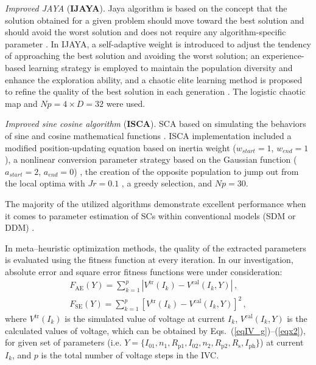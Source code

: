 \documentclass[a4paper,fleqn]{cas-sc}
\begin{document}
\emph{Improved JAYA} (\textbf{IJAYA}).
Jaya algorithm is based on the concept
that the solution obtained for a given problem should move toward the best solution and should
avoid the worst solution and does not require any algorithm-specific parameter \cite{JAYA}.
In IJAYA, a self-adaptive weight is introduced to adjust the tendency of approaching the best solution
and avoiding the worst solution;
an experience-based learning strategy is employed to maintain the population diversity and enhance the exploration ability,
and a chaotic elite learning method is proposed to refine the quality of the best solution in each generation \cite{IJAYA}.
The logistic chaotic map and $N\!p=4\times D=32$ were used.

\emph{Improved sine cosine algorithm} (\textbf{ISCA}).
SCA based on simulating the behaviors of sine and cosine mathematical functions \cite{SCA}.
ISCA implementation included a modified position-updating equation based on inertia weight
($w_{start}=1$, $w_{end}=1$),
a nonlinear conversion parameter strategy based on the Gaussian function
($a_{start}=2$, $a_{end}=0$) \cite{ISCA2},
the creation of the opposite population to jump out from the local optima with $J\!r=0.1$ \cite{ISCA3},
a greedy selection, and $N\!p=30$.

The majority of the utilized algorithms demonstrate excellent performance when
it comes to parameter estimation of SCs within conventional models (SDM or DDM) \cite{CWOA,DEWang,GOTLBO,IJAYA,MABC,PSO,STLBO,TLBO_Patel,LSHADE,IWOA}.

In meta--heuristic optimization methods, the quality of the extracted parameters is evaluated using the fitness function at
every iteration.
In our investigation, absolute error and square error fitness functions were under consideration:
\begin{gather}
\label{eqFae}
F_\mathrm{AE}(Y)= \sum_{k=1}^p \left|V^\mathrm{tr}(I_k)-V^\mathrm{cal}(I_k,Y)\right|\,,\\
\label{eqFse}
F_\mathrm{SE}(Y)= \sum_{k=1}^p \left[V^\mathrm{tr}(I_k)-V^\mathrm{cal}(I_k,Y)\right]^2\,,
\end{gather}
where
$V^\mathrm{tr}(I_k)$ is the simulated value of voltage at current $I_k$,
$V^\mathrm{cal}(I_k,Y)$ is the calculated values of voltage, which can be obtained
by Eqs.~(\ref{eqIV_g})--(\ref{eqx2}),
for given set of parameters (i.e. $Y = \{I_{01},n_1,R_\mathrm{p1},I_{02},n_2,R_\mathrm{p2},R_\mathrm{s},I_\mathrm{ph}\}$)
at current $I_k$,
and $p$ is the total number of voltage steps in the IVC.
\end{document}
